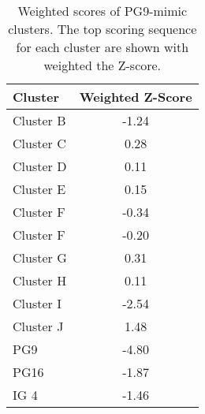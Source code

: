 \begin{table}[!h]
\centering
\begin{tabular}{lc}
\textbf{Cluster}   & \textbf{Weighted Z-Score} \\
\hline
Cluster B & -1.24            \\
Cluster C & 0.28             \\
Cluster D & 0.11             \\
Cluster E & 0.15             \\
Cluster F & -0.34            \\
Cluster F & -0.20            \\
Cluster G & 0.31             \\
Cluster H & 0.11             \\
Cluster I & -2.54            \\
Cluster J & 1.48             \\
PG9       & -4.80            \\
PG16      & -1.87            \\
IG 4      & -1.46
\end{tabular}
\caption[Weighted Scores of PG9-Mimic Clusters]{Weighted scores of PG9-mimic clusters. The top scoring sequence for each cluster are shown with weighted the Z-score.}
\label{tab:table3_4}
\end{table}